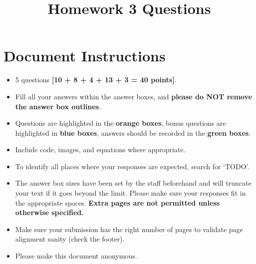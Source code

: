\pagestyle{fancy}
\fancyhf{}

\date{}

\title{\vspace{-1cm}Homework 3 Questions}



\maketitle
\vspace{-2cm}
\thispagestyle{fancy}

\section*{ Document Instructions}
\begin{itemize}
  \item 5 questions \textbf{[10 + 8 + 4 + 13 + 3 = 40 points]}.
  \item Fill all your answers within the answer boxes, and \textbf{please do NOT remove the answer box outlines}.
  \item Questions are highlighted in the \textbf{orange boxes}, bonus questions are highlighted in \textbf{blue boxes}, answers should be recorded in the \textbf{green boxes}.
  \item Include code, images, and equations where appropriate.
  \item To identify all places where your responses are expected, search for `TODO'.
  \item The answer box sizes have been set by the staff beforehand and will truncate your text if it goes beyond the limit. Please make sure your responses fit in the appropriate spaces. \textbf{Extra pages are not permitted unless otherwise specified.}
  \item Make sure your submission has the right number of pages to validate page alignment sanity (check the footer).
  \item Please make this document anonymous.
\end{itemize}

